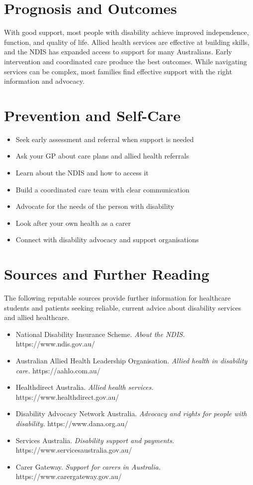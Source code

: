 \section*{Prognosis and Outcomes}
With good support, most people with disability achieve improved independence, function, and quality of life. Allied health services are effective at building skills, and the NDIS has expanded access to support for many Australians. Early intervention and coordinated care produce the best outcomes. While navigating services can be complex, most families find effective support with the right information and advocacy.

\section*{Prevention and Self-Care}
\begin{itemize}
    \item Seek early assessment and referral when support is needed
    \item Ask your GP about care plans and allied health referrals
    \item Learn about the NDIS and how to access it
    \item Build a coordinated care team with clear communication
    \item Advocate for the needs of the person with disability
    \item Look after your own health as a carer
    \item Connect with disability advocacy and support organisations
\end{itemize}

\section*{Sources and Further Reading}
The following reputable sources provide further information for healthcare students and patients seeking reliable, current advice about disability services and allied healthcare.

\begin{itemize}
    \item National Disability Insurance Scheme. \textit{About the NDIS.} https://www.ndis.gov.au/
    \item Australian Allied Health Leadership Organisation. \textit{Allied health in disability care.} https://aahlo.com.au/
    \item Healthdirect Australia. \textit{Allied health services.} https://www.healthdirect.gov.au/
    \item Disability Advocacy Network Australia. \textit{Advocacy and rights for people with disability.} https://www.dana.org.au/
    \item Services Australia. \textit{Disability support and payments.} https://www.servicesaustralia.gov.au/
    \item Carer Gateway. \textit{Support for carers in Australia.} https://www.carergateway.gov.au/
\end{itemize}
